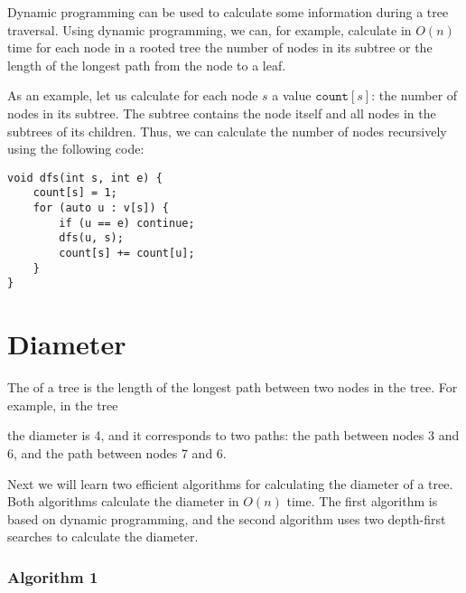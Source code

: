 Dynamic programming can be used to calculate
some information during a tree traversal.
Using dynamic programming, we can, for example,
calculate in $O(n)$ time for each node
in a rooted tree the
number of nodes in its subtree
or the length of the longest path from the node
to a leaf.

As an example, let us calculate for each node $s$
a value $\texttt{count}[s]$: the number of nodes in its subtree.
The subtree contains the node itself and
all nodes in the subtrees of its children.
Thus, we can calculate the number of nodes
recursively using the following code:

\begin{lstlisting}
void dfs(int s, int e) {
    count[s] = 1;
    for (auto u : v[s]) {
        if (u == e) continue;
        dfs(u, s);
        count[s] += count[u];
    }
}
\end{lstlisting}

\section{Diameter}


The  of a tree
is the length of the longest path
between two nodes in the tree.
For example, in the tree
\begin{center}
\end{center}
the diameter is 4, and it corresponds to two paths:
the path between nodes 3 and 6,
and the path between nodes 7 and 6.

Next we will learn two efficient algorithms
for calculating the diameter of a tree.
Both algorithms calculate the diameter in $O(n)$ time.
The first algorithm is based on dynamic programming,
and the second algorithm uses two depth-first searches
to calculate the diameter.

\subsubsection{Algorithm 1}

